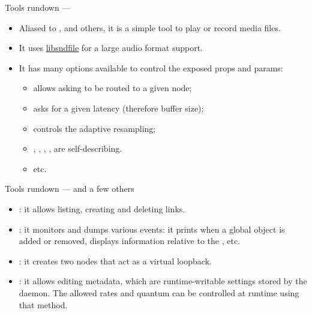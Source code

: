 \begin{frame}{Tools rundown — }
  \begin{itemize}

  \item Aliased to ,  and others, it is a
    simple tool to play or record media files.

  \item It uses \href{https://libsndfile.github.io/libsndfile/}{libsndfile}
    for a large audio format support.

  \item It has many options available to control the exposed props and
    params:

    \begin{itemize}
    \item {} allows asking to be routed to a given node;
    \item {} asks for a given latency (therefore buffer size);
    \item {} controls the adaptive resampling;
    \item {}, , ,
      ,  are self-describing.
    \item etc.
    \end{itemize}

  \end{itemize}
\end{frame}



\begin{frame}{Tools rundown — and a few others}
  \begin{itemize}

  \item {}: it allows listing, creating and deleting links.

  \item {}: it monitors and dumps various events: it prints
    when a global object is added or removed, displays information
    relative to the , etc.

  \item {}: it creates two nodes that act as a virtual
    loopback.

  \item {}: it allows editing metadata, which are
    runtime-writable settings stored by the daemon. The allowed rates
    and quantum can be controlled at runtime using that method.

  \end{itemize}
\end{frame}



